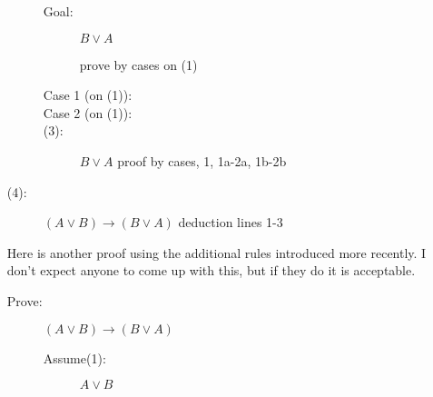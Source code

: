 \documentclass[12pt]{article}
\begin{document}
\begin{enumerate}
\begin{description}
\begin{description}
\item[Goal:]  $B \vee A$

prove by cases on (1)

\item[Case 1 (on (1)):]  


\item[Case 2 (on (1)):]  


\item[(3):]  $B \vee A$  proof by cases, 1, 1a-2a, 1b-2b

\end{description}
\item[(4):]  $(A \vee B) \rightarrow (B \vee A)$  deduction lines 1-3

\end{description}

Here is another proof using the additional rules introduced more recently.  I don't expect anyone to come up with this, but if they do it is acceptable.

\begin{description}

\item[Prove:]  $(A \vee B) \rightarrow (B \vee A)$

\begin{description}
\item[Assume(1):] $A \vee B$


\end{description}
\end{description}
\end{enumerate}
\end{document}
